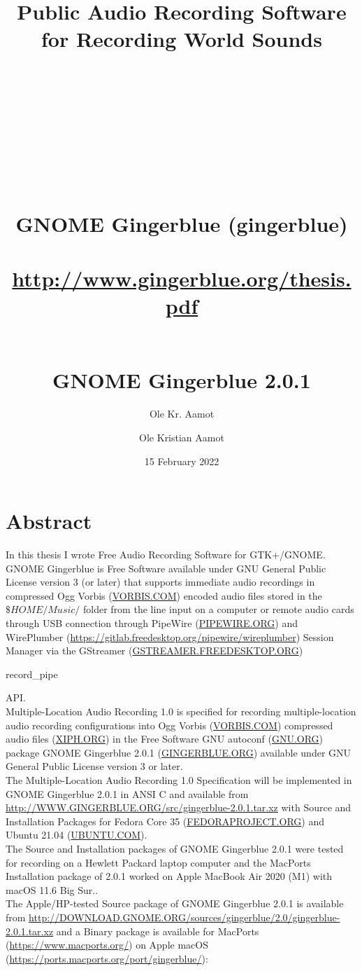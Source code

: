 \documentclass[UKenglish]{ifimaster}  %
\author{Ole Kr. Aamot}
\title{
 Public Audio Recording Software for Recording World Sounds\\\\
 \begin{large}\\
 \\
 \\
 \\
   GNOME Gingerblue (gingerblue)\\
 \\
   \url{http://www.gingerblue.org/thesis.pdf}
  \end{large}
}
\title{\\GNOME Gingerblue 2.0.1}
\author{Ole Kristian Aamot}
\date{15 February 2022}
\begin{document}
\duoforside[dept={Department of Physics},   %
  program={Electrical Engineering, Informatics and Technology},  %
  short]                                        %

\frontmatter{}
\mainmatter
\chapter*{Abstract}                   %
\noindent In this thesis I wrote Free Audio Recording Software for GTK+/GNOME.\\

GNOME Gingerblue is Free Software available under GNU General Public
License version 3 (or later) that supports immediate audio recordings in
compressed Ogg Vorbis (\url{VORBIS.COM}) encoded audio files stored in
the $\$HOME/Music/$ folder from the line input on a computer or remote
audio cards through USB connection through PipeWire
(\url{PIPEWIRE.ORG}) and WirePlumber
(\url{https://gitlab.freedesktop.org/pipewire/wireplumber}) Session
Manager via the GStreamer (\url{GSTREAMER.FREEDESKTOP.ORG})
\begin{tt}record\_pipe\end{tt} API.\\

Multiple-Location Audio Recording 1.0 is specified for recording
multiple-location audio recording configurations into Ogg Vorbis
(\url{VORBIS.COM}) compressed audio files (\url{XIPH.ORG}) in the Free
Software GNU autoconf (\url{GNU.ORG}) package GNOME Gingerblue 2.0.1
(\url{GINGERBLUE.ORG}) available under GNU General Public License
version 3 or later.\\

The Multiple-Location Audio Recording 1.0 Specification will be
implemented in GNOME Gingerblue 2.0.1 in ANSI C and available from
\url{http://WWW.GINGERBLUE.ORG/src/gingerblue-2.0.1.tar.xz} with
Source and Installation Packages for Fedora Core 35
(\url{FEDORAPROJECT.ORG}) and Ubuntu 21.04 (\url{UBUNTU.COM}).\\

The Source and Installation packages of GNOME Gingerblue 2.0.1 were
tested for recording on a Hewlett Packard laptop computer and the
MacPorts Installation package of 2.0.1 worked on Apple MacBook Air 2020
(M1) with macOS 11.6 Big Sur..\\

The Apple/HP-tested Source package of GNOME Gingerblue 2.0.1 is available from
\url{http://DOWNLOAD.GNOME.ORG/sources/gingerblue/2.0/gingerblue-2.0.1.tar.xz} and a Binary package is available for MacPorts (\url{https://www.macports.org/}) on Apple macOS (\url{https://ports.macports.org/port/gingerblue/}):
\end{document}

